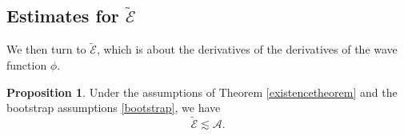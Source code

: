 \documentclass[11pt,reqno]{amsart}
\theoremstyle{definition}
\newtheorem{proposition}{Proposition}[section]
\newtheorem{remark}{Remark}[section]
\numberwithin{equation}{section}
\begin{document}
\subsection{Estimates for $\widetilde{\mathcal{E}}$} We then turn to $\widetilde{\mathcal{E}}$, which is about the derivatives of the derivatives of the wave function $\phi$.
\begin{proposition}\label{estimate-tildeE}
Under the assumptions of Theorem \ref{existencetheorem} and the bootstrap assumptions \eqref{bootstrap}, we have
$$\widetilde{\mathcal{E}}\lesssim\mathcal{A}.$$
\end{proposition}
\end{document}
